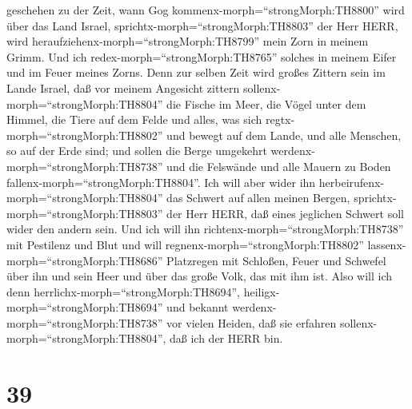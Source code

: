 geschehen zu der Zeit, wann Gog kommenx-morph=``strongMorph:TH8800''
wird über das Land Israel, sprichtx-morph=``strongMorph:TH8803'' der
Herr HERR, wird heraufziehenx-morph=``strongMorph:TH8799'' mein Zorn in
meinem Grimm.  Und ich redex-morph=``strongMorph:TH8765''
solches in meinem Eifer und im Feuer meines Zorns. Denn zur selben Zeit
wird großes Zittern sein im Lande Israel,  daß vor meinem
Angesicht zittern sollenx-morph=``strongMorph:TH8804'' die Fische im
Meer, die Vögel unter dem Himmel, die Tiere auf dem Felde und alles, was
sich regtx-morph=``strongMorph:TH8802'' und bewegt auf dem Lande, und
alle Menschen, so auf der Erde sind; und sollen die Berge umgekehrt
werdenx-morph=``strongMorph:TH8738'' und die Felswände und alle Mauern
zu Boden fallenx-morph=``strongMorph:TH8804''.  Ich will
aber wider ihn herbeirufenx-morph=``strongMorph:TH8804'' das Schwert auf
allen meinen Bergen, sprichtx-morph=``strongMorph:TH8803'' der Herr
HERR, daß eines jeglichen Schwert soll wider den andern sein.
 Und ich will ihn richtenx-morph=``strongMorph:TH8738'' mit
Pestilenz und Blut und will regnenx-morph=``strongMorph:TH8802''
lassenx-morph=``strongMorph:TH8686'' Platzregen mit Schloßen, Feuer und
Schwefel über ihn und sein Heer und über das große Volk, das mit ihm
ist.  Also will ich denn
herrlichx-morph=``strongMorph:TH8694'',
heiligx-morph=``strongMorph:TH8694'' und bekannt
werdenx-morph=``strongMorph:TH8738'' vor vielen Heiden, daß sie erfahren
sollenx-morph=``strongMorph:TH8804'', daß ich der HERR bin.

\hypertarget{section-38}{%
\section{39}\label{section-38}}

